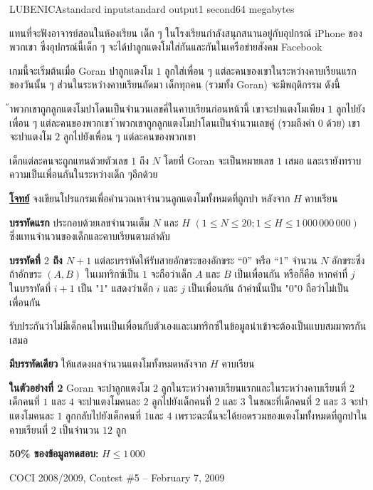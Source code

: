 \documentclass[11pt,a4paper]{article}
\begin{document}
\begin{problem}{LUBENICA}{standard input}{standard output}{1 second}{64 megabytes}

  
แทนที่จะฟังอาจารย์สอนในห้องเรียน เด็ก ๆ ในโรงเรียนกำลังสนุกสนานอยู่กับอุปกรณ์ iPhone ของพวกเขา ซึ่งอุปกรณ์นี้เด็ก ๆ จะได้ปาลูกแตงโมใส่กันและกันในเครือข่ายสังคม Facebook

เกมนี้จะเริ่มต้นเมื่อ Goran ปาลูกแตงโม $1$ ลูกใส่เพื่อน ๆ แต่ละคนของเขาในระหว่างคาบเรียนแรกของวันนั้น ๆ ส่วนในระหว่างคาบเรียนถัดมา เด็กทุกคน (รวมทั้ง Goran) จะมีพฤติกรรม ดังนี้

\begin{itemize}

้าพวกเขาถูกลูกแตงโมปาโดนเป็นจำนวนเลขคี่ในคาบเรียนก่อนหน้านี้ เขาจะปาแตงโมเพียง $1$ ลูกไปยังเพื่อน ๆ แต่ละคนของพวกเขา
    ้าพวกเขาถูกลูกแตงโมปาโดนเป็นจำนวนเลขคู่ (รวมถึงค่า $0$ ด้วย) เขาจะปาแตงโม $2$ ลูกไปยังเพื่อน ๆ แต่ละคนของพวกเขา
    
 
\end{itemize}
เด็กแต่ละคนจะถูกแทนด้วยตัวเลข $1$ ถึง $N$ โดยที่ Goran จะเป็นหมายเลข $1$ เสมอ และเรายังทราบความเป็นเพื่อนกันในระหว่างเด็ก ๆอีกด้วย

\bigskip
\underline{\textbf{โจทย์}}  จงเขียนโปรแกรมเพื่อคำนวณหาจำนวนลูกแตงโมทั้งหมดที่ถูกปา หลังจาก $H$ คาบเรียน

\InputFile

\textbf{บรรทัดแรก} ประกอบด้วยเลขจํานวนเต็ม $N$ และ $H$ $(1 \leq N \leq 20; 1 \leq H \leq 1\,000\,000\,000)$ ซึ่งแทนจํานวนของเด็กและคาบเรียนตามลําดับ

\textbf{บรรทัดที่ $2$ ถึง $N+1$} แต่ละบรรทัดให้รับสายอักขระของอักขระ “0” หรือ “1” จํานวน $N$ อักขระซึ่งถ้าอักขระ $(A, B)$ ในเมทริกซ์เป็น $1$ จะถือว่าเด็ก $A$ และ $B$ เป็นเพื่อนกัน หรือก็คือ หากค่าที่ $j$ ในบรรทัดที่ $i+1$ เป็น "1" แสดงว่าเด็ก $i$ และ $j$ เป็นเพื่อนกัน ถ้าค่านั้นเป็น "0"0 ถือว่าไม่เป็นเพื่อนกัน

รับประกันว่าไม่มีเด็กคนไหนเป็นเพื่อนกับตัวเองและเมทริกซ์ในข้อมูลนําเข้าจะต้องเป็นแบบสมมาตรกันเสมอ

\OutputFile

\textbf{มีบรรทัดเดียว} ให้แสดงผลจํานวนแตงโมทั้งหมดหลังจาก $H$ คาบเรียน

\Examples

\begin{example}
%
%
%
\end{example}

\Note 

\textbf{ในตัวอย่างที่ 2}  Goran จะปาลูกแตงโม $2$ ลูกในระหว่างคาบเรียนแรกและในระหว่างคาบเรียนที่ $2$ เด็กคนที่ $1$ และ $4$ จะปาแตงโมคนละ $2$ ลูกไปยังเด็กคนที่ $2$ และ $3$ ในขณะที่เด็กคนที่ $2$ และ $3$ จะปาแตงโมคนละ $1$ ลูกกลับไปยังเด็กคนที่ $1$และ $4$ เพราะฉะนั้นจะได้ยอดรวมของแตงโมทั้งหมดที่ถูกปาในคาบเรียนที่ $2$ เป็นจํานวน $12$ ลูก

\Scoring 

\textbf{50\% ของข้อมูลทดสอบ:} $H \leq 1\,000$

\Source

COCI 2008/2009, Contest \#5 – February 7, 2009


\end{problem}
\end{document}
